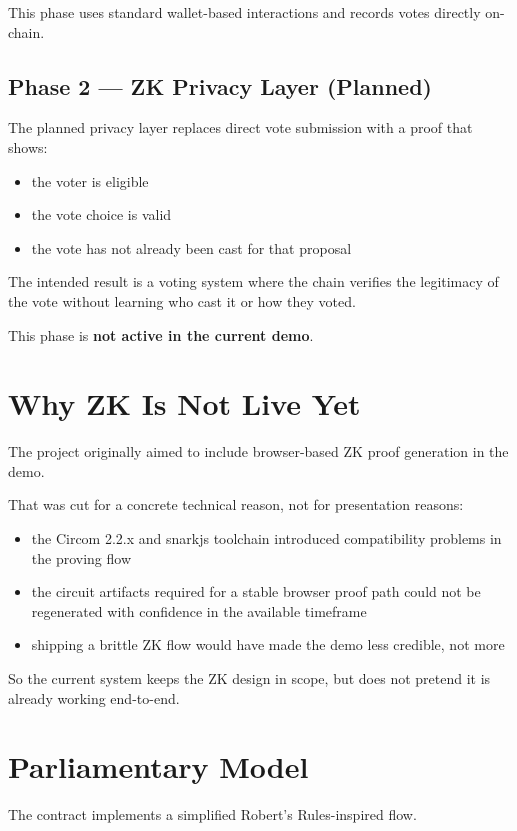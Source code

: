 \documentclass[12pt]{article}
\begin{document}
This phase uses standard wallet-based interactions and records votes directly on-chain.

\subsection{Phase 2 --- ZK Privacy Layer (Planned)}

The planned privacy layer replaces direct vote submission with a proof that shows:
\begin{itemize}
    \item the voter is eligible
    \item the vote choice is valid
    \item the vote has not already been cast for that proposal
\end{itemize}

The intended result is a voting system where the chain verifies the legitimacy of the vote without learning who cast it or how they voted.

This phase is \textbf{not active in the current demo}.

\section{Why ZK Is Not Live Yet}

The project originally aimed to include browser-based ZK proof generation in the demo.

That was cut for a concrete technical reason, not for presentation reasons:
\begin{itemize}
    \item the Circom 2.2.x and snarkjs toolchain introduced compatibility problems in the proving flow
    \item the circuit artifacts required for a stable browser proof path could not be regenerated with confidence in the available timeframe
    \item shipping a brittle ZK flow would have made the demo less credible, not more
\end{itemize}

So the current system keeps the ZK design in scope, but does not pretend it is already working end-to-end.

\section{Parliamentary Model}

The contract implements a simplified Robert's Rules-inspired flow.
\end{document}
